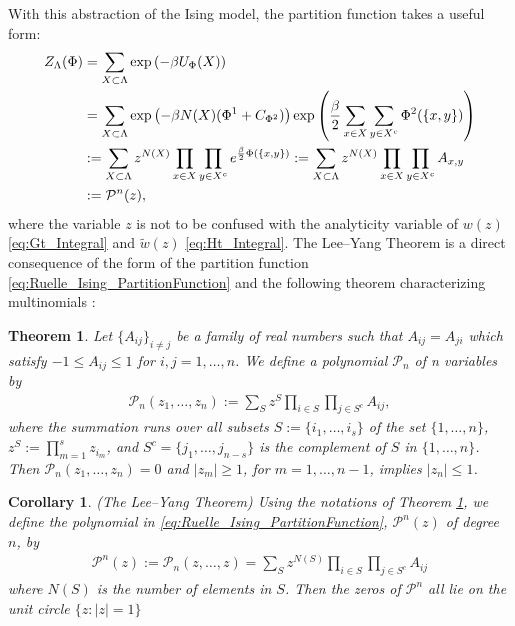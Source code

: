 \documentclass[english,12pt]{ttuthes}
\newtheorem{corollary}{Corollary}[chapter]
\newtheorem{theorem}{Theorem}[chapter]
\begin{document}
With this abstraction of the Ising model, the partition function takes
a useful form:
%
\begin{align}\label{eq:Ruelle_Ising_PartitionFunction}
  Z_\Lambda(\Phi)&=\sum_{X\subset\Lambda}\exp{\left(-\beta U_\Phi(X)\right)}\\
  &=\sum_{X\subset\Lambda}\exp{\left(-\beta N(X)(\Phi^1+C_{\Phi^2})\right)}
          \exp{\left(\frac{\beta}{2}\sum_{x\in X}\sum_{y\in X^c}\Phi^2(\{x,y\})\right)}
  \notag\\
       &:=\sum_{X\subset\Lambda}z^{N(X)}\prod_{x\in X}\prod_{y\in X^c}e^{\frac{\beta}{2}\Phi(\{x,y\})}
       :=\sum_{X\subset\Lambda}z^{N(X)}\prod_{x\in X}\prod_{y\in X^c}A_{x,y}\notag\\
       &:=\mathcal{P}^n(z),\notag
\end{align}
%
where the variable $z$ is not to be confused with the analyticity
variable of $w(z)$ \eqref{eq:Gt_Integral} and $\tilde{w}(z)$
\eqref{eq:Ht_Integral}. The Lee--Yang Theorem is a direct consequence
of the form of the partition function
\eqref{eq:Ruelle_Ising_PartitionFunction} and the following theorem
characterizing multinomials \cite{Ruelle-1969}: 
%
\begin{theorem}
  \label{thm:GenLeeYang}
  Let $\{A_{ij}\}_{i\neq j}$ be a family of real numbers such that
  $A_{ij}=A_{ji}$ which satisfy $-1\leq A_{ij}\leq1$ for $i,j=1,\ldots,n$. We
  define a polynomial $\mathcal{P}_n$ of n variables by
  \begin{align*}
    \mathcal{P}_n(z_1,\ldots,z_n):=\sum_Sz^S\prod_{i\in S}\prod_{j\in S^c}A_{ij},
  \end{align*}
  where the summation runs over all subsets $S:=\{i_1,\ldots,i_s\}$ of the
  set $\{1,\ldots,n\}$, $z^S:=\prod_{m=1}^sz_{i_m}$, and $S^c=\{j_1,\ldots,j_{n-s}\}$ is
  the complement of $S$ in $\{1,\ldots,n\}$. Then
  $\mathcal{P}_n(z_1,\ldots,z_n)=0$ and $|z_m|\geq1$, for $m=1,\ldots ,n-1$,
  implies $|z_n|\leq1$. 
\end{theorem}
%
\begin{corollary}(The Lee--Yang Theorem)
  \label{thm:LeeYang}
  Using the notations of Theorem \ref{thm:GenLeeYang}, we define the
  polynomial in \eqref{eq:Ruelle_Ising_PartitionFunction},
  $\mathcal{P}^n(z)$ of degree $n$, by 
  \begin{align*}
    \mathcal{P}^n(z):=\mathcal{P}_n(z,\ldots,z)=\sum_Sz^{N(S)}\prod_{i\in S}\prod_{j\in S^c}A_{ij}
  \end{align*}
  where $N(S)$ is the number of elements in $S$. Then the zeros of
  $\mathcal{P}^n$ all lie on the unit circle $\{z:|z| =1\}$
\end{corollary}
\end{document}
